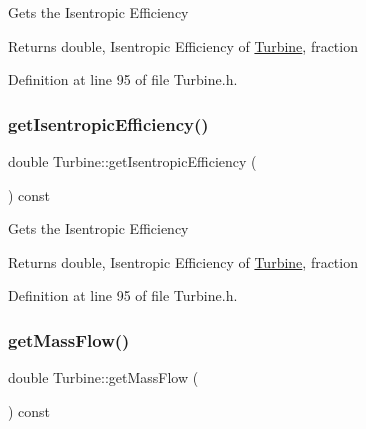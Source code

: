 Gets the Isentropic Efficiency

\begin{DoxyReturn}{Returns}
double, Isentropic Efficiency of \hyperlink{class_turbine}{Turbine}, fraction 
\end{DoxyReturn}


Definition at line 95 of file Turbine.\+h.

\mbox{\label{class_turbine_a5d907859de4acc153a32bd443238b445}} 
\subsubsection{\texorpdfstring{get\+Isentropic\+Efficiency()}{getIsentropicEfficiency()}\hspace{0.1cm}{\footnotesize\ttfamily [3/3]}}
{\footnotesize\ttfamily double Turbine\+::get\+Isentropic\+Efficiency (\begin{DoxyParamCaption}{ }\end{DoxyParamCaption}) const\hspace{0.3cm}{\ttfamily [inline]}}

Gets the Isentropic Efficiency

\begin{DoxyReturn}{Returns}
double, Isentropic Efficiency of \hyperlink{class_turbine}{Turbine}, fraction 
\end{DoxyReturn}


Definition at line 95 of file Turbine.\+h.

\mbox{\label{class_turbine_a4893a203dbbf9db9ca77a0b278c4c118}} 
\subsubsection{\texorpdfstring{get\+Mass\+Flow()}{getMassFlow()}\hspace{0.1cm}{\footnotesize\ttfamily [1/3]}}
{\footnotesize\ttfamily double Turbine\+::get\+Mass\+Flow (\begin{DoxyParamCaption}{ }\end{DoxyParamCaption}) const\hspace{0.3cm}{\ttfamily [inline]}}

